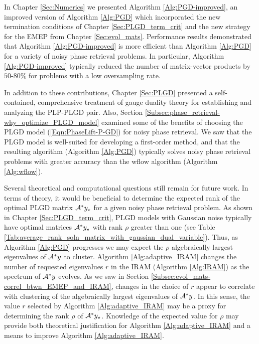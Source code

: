 In Chapter \ref{Sec:Numerics} we presented Algorithm \ref{Alg:PGD-improved}, an improved version of Algorithm \ref{Alg:PGD} which incorporated the new termination conditions of Chapter \ref{Sec:PLGD_term_crit} and the new strategy for the EMEP from Chapter \ref{Sec:evol_mats}.
Performance results demonstrated that Algorithm \ref{Alg:PGD-improved} is more efficient than Algorithm \ref{Alg:PGD} for a variety of noisy phase retrieval problems.
In particular, Algorithm \ref{Alg:PGD-improved} typically reduced the number of matrix-vector products by $50$-$80\%$ for problems with a low oversampling rate.


In addition to these contributions, Chapter \ref{Sec:PLGD} presented a self-contained, comprehensive treatment of gauge duality theory for establishing and analyzing the PLP-PLGD pair.
Also, Section \ref{Subsec:phase_retrieval-why_optimize_PLGD_model} examined some of the benefits of choosing the PLGD model (\ref{Eqn:PhaseLift-P-GD}) for noisy phase retrieval.
We saw that the PLGD model is well-suited for developing a first-order method, and that the resulting algorithm (Algorithm \ref{Alg:PGD}) typically solves noisy phase retrieval problems with greater accuracy than the wflow algorithm (Algorithm \ref{Alg:wflow}).


Several theoretical and computational questions still remain for future work.  
In terms of theory, it would be beneficial to determine the expected rank of the optimal PLGD matrix ${\mathcal A}^*y_\star$ for a given noisy phase retrieval problem. 
As shown in Chapter \ref{Sec:PLGD_term_crit}, PLGD models with Gaussian noise typically have optimal matrices ${\mathcal A}^*y_\star$ with rank $\rho$ greater than one (see Table \ref{Tab:average_rank_soln_matrix_with_gaussian_dual_variable}).
Thus, as Algorithm \ref{Alg:PGD} progresses we may expect the $\rho$ algebraically largest eigenvalues of ${\mathcal A}^*y$ to cluster.
Algorithm \ref{Alg:adaptive_IRAM} changes the number of requested eigenvalues $r$ in the IRAM (Algorithm \ref{Alg:IRAM}) as the spectrum of ${\mathcal A}^*y$ evolves.
As we saw in Section \ref{Subsec:evol_mats-correl_btwn_EMEP_and_IRAM}, changes in the choice of $r$ appear to correlate with clustering of the algebraically largest eigenvalues of ${\mathcal A}^*y$.
In this sense, the value $r$ selected by Algorithm \ref{Alg:adaptive_IRAM} may be a proxy for determining the rank $\rho$ of ${\mathcal A}^*y_\star$.
Knowledge of the expected value for $\rho$ may provide both theoretical justification for Algorithm \ref{Alg:adaptive_IRAM} and a means to improve Algorithm \ref{Alg:adaptive_IRAM}.


